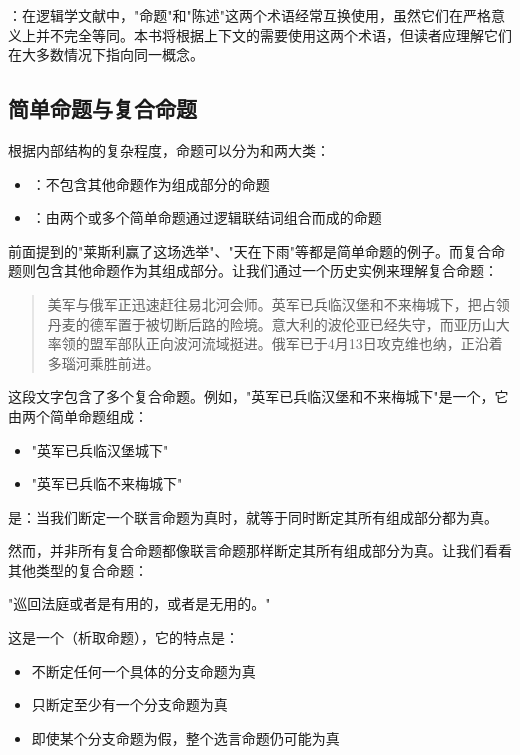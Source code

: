 ：在逻辑学文献中，"命题"和"陈述"这两个术语经常互换使用，虽然它们在严格意义上并不完全等同。本书将根据上下文的需要使用这两个术语，但读者应理解它们在大多数情况下指向同一概念。

\subsection{简单命题与复合命题}

根据内部结构的复杂程度，命题可以分为和两大类：

\begin{theorembox}[title=命题的分类]
\begin{itemize}
  \item {}：不包含其他命题作为组成部分的命题
  \item {}：由两个或多个简单命题通过逻辑联结词组合而成的命题
\end{itemize}
\end{theorembox}

前面提到的"莱斯利赢了这场选举"、"天在下雨"等都是简单命题的例子。而复合命题则包含其他命题作为其组成部分。让我们通过一个历史实例来理解复合命题：

\begin{quotation}
美军与俄军正迅速赶往易北河会师。英军已兵临汉堡和不来梅城下，把占领丹麦的德军置于被切断后路的险境。意大利的波伦亚已经失守，而亚历山大率领的盟军部队正向波河流域挺进。俄军已于4月13日攻克维也纳，正沿着多瑙河乘胜前进。\cite{shirer1960}
\end{quotation}

这段文字包含了多个复合命题。例如，"英军已兵临汉堡和不来梅城下"是一个，它由两个简单命题组成：
\begin{itemize}
  \item "英军已兵临汉堡城下"
  \item "英军已兵临不来梅城下"
\end{itemize}

是：当我们断定一个联言命题为真时，就等于同时断定其所有组成部分都为真。

然而，并非所有复合命题都像联言命题那样断定其所有组成部分为真。让我们看看其他类型的复合命题：

\begin{examplebox}[title=选言命题]
"巡回法庭或者是有用的，或者是无用的。"\cite{lincoln1861}

这是一个（析取命题），它的特点是：
\begin{itemize}
  \item 不断定任何一个具体的分支命题为真
  \item 只断定至少有一个分支命题为真
  \item 即使某个分支命题为假，整个选言命题仍可能为真
\end{itemize}
\end{examplebox}

